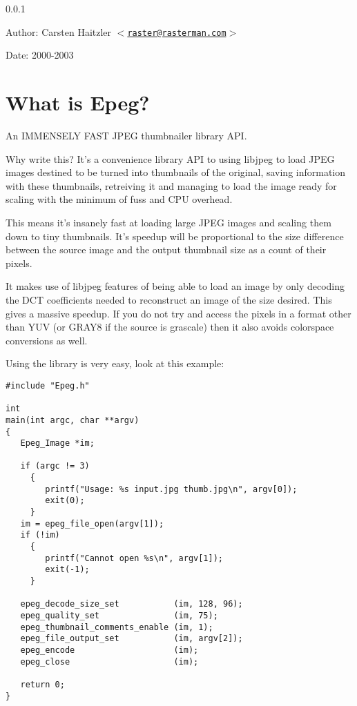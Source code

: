  0.0.1 \begin{Desc}
\item[Author:]Carsten Haitzler $<$\href{mailto:raster@rasterman.com}{\tt raster@rasterman.com}$>$ \end{Desc}
\begin{Desc}
\item[Date:]2000-2003\end{Desc}
\hypertarget{index_intro}{}\section{What is Epeg?}\label{intro}
An IMMENSELY FAST JPEG thumbnailer library API.

Why write this? It's a convenience library API to using libjpeg to load JPEG images destined to be turned into thumbnails of the original, saving information with these thumbnails, retreiving it and managing to load the image ready for scaling with the minimum of fuss and CPU overhead.

This means it's insanely fast at loading large JPEG images and scaling them down to tiny thumbnails. It's speedup will be proportional to the size difference between the source image and the output thumbnail size as a count of their pixels.

It makes use of libjpeg features of being able to load an image by only decoding the DCT coefficients needed to reconstruct an image of the size desired. This gives a massive speedup. If you do not try and access the pixels in a format other than YUV (or GRAY8 if the source is grascale) then it also avoids colorspace conversions as well.

Using the library is very easy, look at this example:



\footnotesize\begin{verbatim}#include "Epeg.h"

int
main(int argc, char **argv)
{
   Epeg_Image *im;

   if (argc != 3)
     {
        printf("Usage: %s input.jpg thumb.jpg\n", argv[0]);
        exit(0);
     }
   im = epeg_file_open(argv[1]);
   if (!im)
     {
        printf("Cannot open %s\n", argv[1]);
        exit(-1);
     }
   
   epeg_decode_size_set           (im, 128, 96);
   epeg_quality_set               (im, 75);
   epeg_thumbnail_comments_enable (im, 1);
   epeg_file_output_set           (im, argv[2]);
   epeg_encode                    (im);
   epeg_close                     (im);
   
   return 0;
}
\end{verbatim}\normalsize


